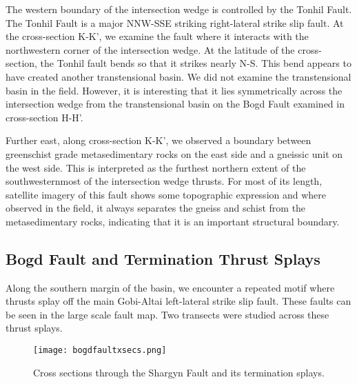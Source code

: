 The western boundary of the intersection wedge is controlled by the Tonhil Fault. The Tonhil Fault is a major NNW-SSE striking right-lateral strike slip fault. At the cross-section K-K', we examine the fault where it interacts with the northwestern corner of the intersection wedge. At the latitude of the cross-section, the Tonhil fault bends so that it strikes nearly N-S. This bend appears to have created another transtensional basin. We did not examine the transtensional basin in the field. However, it is interesting that it lies symmetrically across the intersection wedge from the transtensional basin on the Bogd Fault examined in cross-section H-H'. 

Further east, along cross-section K-K', we observed a boundary between greenschist grade metasedimentary rocks on the east side and a gneissic unit on the west side. This is interpreted as the furthest northern extent of the southwesternmost of the intersection wedge thrusts. For most of its length, satellite imagery of this fault shows some topographic expression and where observed in the field, it always separates the gneiss and schist from the metasedimentary rocks, indicating that it is an important structural boundary. 

\subsection{Bogd Fault and Termination Thrust Splays}

Along the southern margin of the basin, we encounter a repeated motif where thrusts splay off the main Gobi-Altai left-lateral strike slip fault. These faults can be seen in the large scale fault map. Two transects were studied across these thrust splays. 

\begin{figure}[h!]
  \centering
  \texttt{[image: bogdfaultxsecs.png]}
  \caption{Cross sections through the Shargyn Fault and its termination splays.}
  \label{bogdfaultxsecs}
\end{figure}

